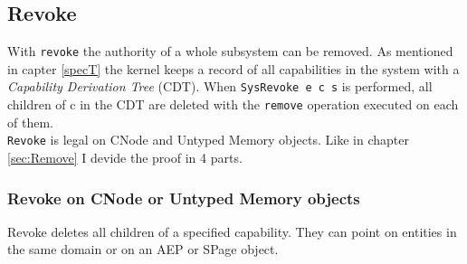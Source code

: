 \subsection{Revoke}\label{sec:Revoke}
With \texttt{revoke} the authority of a whole subsystem can be removed. As mentioned in capter \ref{specT} the kernel keeps a record of all capabilities in the system with a \textit{Capability Derivation Tree} (CDT). When \texttt{SysRevoke e c s} is performed, all children of c in the CDT are deleted with the \texttt{remove} operation executed on each of them. \\
\texttt{Revoke} is legal on CNode and Untyped Memory objects. Like in chapter \ref{sec:Remove} I devide the proof in 4 parts. 
\subsubsection{Revoke on CNode or Untyped Memory objects} 
Revoke deletes all children of a specified capability. They can point on entities in the same domain or on an AEP or SPage object. 
